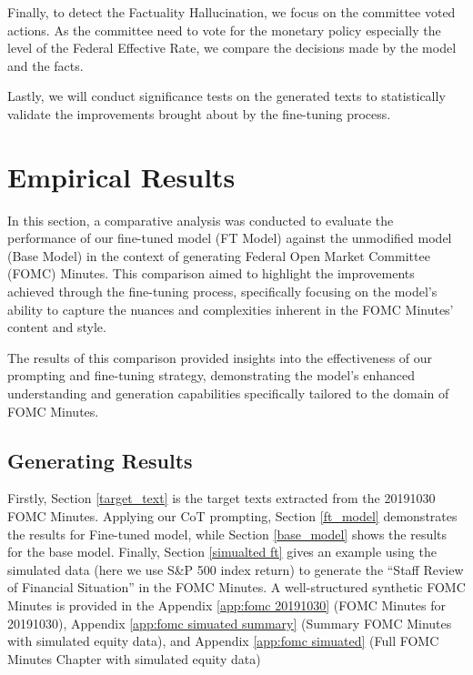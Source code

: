 Finally, to detect the Factuality Hallucination, we focus on the committee voted actions. As the committee need to vote for the monetary policy especially the level of the Federal Effective Rate, we compare the decisions made by the model and the facts. 





Lastly, we will conduct significance tests on the generated texts to statistically validate the improvements brought about by the fine-tuning process. 








\section{Empirical Results}\label{ch2:sec:empirical results}

In this section, a comparative analysis was conducted to evaluate the performance of our fine-tuned model (FT Model) against the unmodified model (Base Model) in the context of generating Federal Open Market Committee (FOMC) Minutes. This comparison aimed to highlight the improvements achieved through the fine-tuning process, specifically focusing on the model's ability to capture the nuances and complexities inherent in the FOMC Minutes' content and style.

The results of this comparison provided insights into the effectiveness of our prompting and fine-tuning strategy, demonstrating the model's enhanced understanding and generation capabilities specifically tailored to the domain of FOMC Minutes. 

\subsection{Generating Results}

Firstly, Section \ref{target_text} is the target texts extracted from the 20191030 FOMC Minutes. Applying our CoT prompting, Section \ref{ft_model} demonstrates the results for Fine-tuned model, while Section \ref{base_model} shows the results for the base model. Finally, Section \ref{simualted ft} gives an example using the simulated data (here we use S\&P 500 index return) to generate the ``Staff Review of Financial Situation'' in the FOMC Minutes. A well-structured synthetic FOMC Minutes is provided in the Appendix \ref{app:fomc 20191030} (FOMC Minutes for 20191030), Appendix \ref{app:fomc simuated summary} (Summary FOMC Minutes with simulated equity data), and Appendix \ref{app:fomc simuated} (Full FOMC Minutes Chapter with simulated equity data)



